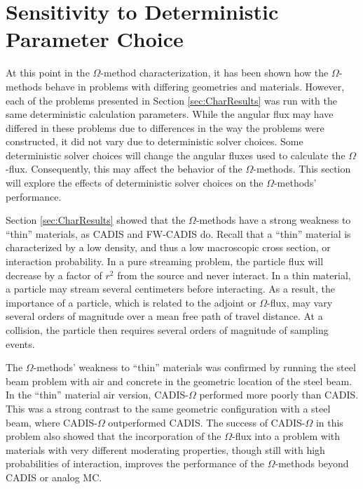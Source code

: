 \section{Sensitivity to Deterministic Parameter Choice}
\label{sec:AngleResults}

At this point in the $\Omega$-method characterization,
it has been shown how the $\Omega$-methods
behave in problems with differing geometries and materials.
However, each of the problems presented in Section \ref{sec:CharResults}
was run with the same deterministic calculation
parameters. While the angular flux may have differed in these problems due to
differences in the way the problems were constructed, it did not
vary due to deterministic
solver choices. Some deterministic solver choices will change the angular
fluxes used to calculate the $\Omega$-flux. Consequently, this may affect the
behavior of the $\Omega$-methods. This section will
explore the effects of deterministic solver
choices on the $\Omega$-methods' performance.

Section \ref{sec:CharResults} showed that the $\Omega$-methods have a strong
weakness to ``thin'' materials, as CADIS and FW-CADIS do. Recall that a
``thin'' material is characterized by a low density, and thus a low macroscopic
cross section, or interaction
probability. In a pure streaming problem, the particle flux will decrease by a
factor of $r^2$ from the source and never interact.
In a thin material, a particle may stream
several centimeters before interacting.
 As a result, the
importance of a particle, which is related to the adjoint or $\Omega$-flux,
may vary several orders of magnitude over a mean free
path of travel distance. 
At a collision, the particle then requires
several orders of
magnitude of sampling events.

The $\Omega$-methods' weakness to ``thin'' materials was confirmed by
running the steel beam problem with air and concrete in the geometric location
of the steel beam. In
the ``thin'' material air version, CADIS-$\Omega$ performed more poorly than CADIS.
This was a strong contrast to the same geometric configuration with a steel
beam, where CADIS-$\Omega$ outperformed CADIS.
The success of CADIS-$\Omega$ in this problem also showed that
the incorporation of the $\Omega$-flux into a problem with materials with
very different moderating properties, though still with high probabilities of
interaction, improves the performance of the $\Omega$-methods beyond CADIS or
analog MC.

